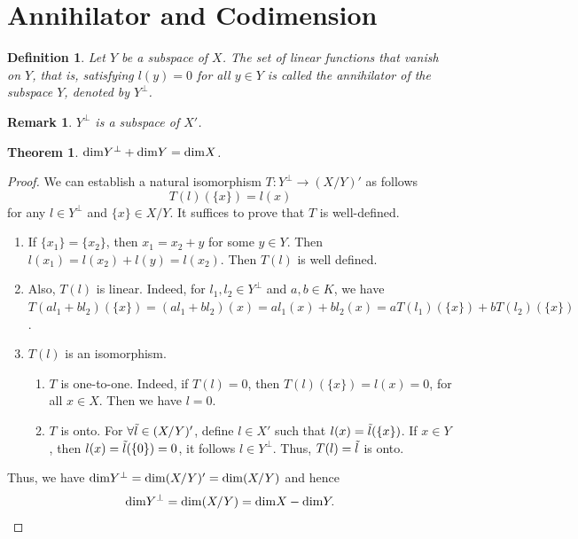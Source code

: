 \documentclass[11pt]{book}
\newtheorem{definition}{Definition}[section]
\newtheorem{theorem}{Theorem}[section]
\newtheorem{remark}{Remark}[section]
\theoremstyle{definition}
\numberwithin{equation}{chapter}
\begin{document}
\medskip

\section{Annihilator and Codimension}
\begin{definition}
Let $Y$ be a subspace of $X$. The set of linear functions that vanish on $Y$, that is, satisfying $l(y) = 0$ for all $y\in Y$ is called the annihilator of the subspace $Y$, denoted by $Y^\bot$.
\end{definition}
\begin{remark}
$Y^\bot$ is a subspace of $X'$.
\end{remark}

\medskip

\begin{theorem}
${\rm dim}Y^\bot + {\rm dim}Y = {\rm dim}X$.
\end{theorem}
\begin{proof}
We can establish a natural isomorphism $T:Y^\bot\to (X/Y)'$ as follows $$T(l)(\{x\}) = l(x)$$
for any $l\in Y^\bot$ and $\{x\}\in X/Y$. It suffices to prove that $T$ is well-defined.
\begin{enumerate}[label=(\alph*)]
    \item If $\{x_1\} = \{x_2\}$, then $x_1 = x_2 + y$ for some $y\in Y$. Then $l(x_1) = l(x_2) + l(y) = l(x_2)$. Then $T(l)$ is well defined.
    \item Also, $T(l)$ is linear. Indeed, for $l_1, l_2\in Y^\bot$ and $a,b \in K$, we have $T(al_1 + bl_2)(\{x\}) = (al_1 + bl_2)(x) = a l_1(x) + bl_2(x) = a T(l_1)(\{x\}) + b T(l_2)(\{x\})$.
    \item $T(l)$ is an isomorphism. 
    \begin{enumerate}[label=\arabic*)]
        \item $T$ is one-to-one. Indeed, if $T(l) = 0$, then $T(l)(\{x\}) = l(x) = 0$, for all $x\in X$. Then we have $l = 0$.
        \item $T$ is onto. For $\forall \Tilde{l}\in (X/Y)'$, define $l\in X'$ such that $l(x) = \Tilde{l}(\{x\})$. If $x\in Y$, then $l(x) = \Tilde{l}(\{0\}) = 0$, it follows $l\in Y^\bot$. Thus, $T(l) = \Tilde{l}$ is onto.
    \end{enumerate}
\end{enumerate}

Thus, we have ${\rm dim}Y^\bot = {\rm dim}(X/Y)' = {\rm dim}(X/Y)$ and hence 
\begin{align*}
    {\rm dim}Y^\bot = {\rm dim}(X/Y) = {\rm dim}X - {\rm dim}Y.
\end{align*}
\end{proof}
\end{document}
